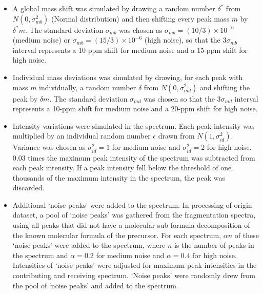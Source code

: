 \documentclass[
]{article}
\begin{document}
\begin{itemize}
\item
  A global mass shift was simulated by drawing a random number
  \(\delta^{*}\) from \(N\left( 0,\sigma_{mb}^{2} \right)\) (Normal
  distribution) and then shifting every peak mass \(m\) by
  \(\delta^{*}m\). The standard deviation \(\sigma_{mb}\) was chosen as
  \(\sigma_{mb} = (10/3) \times 10^{- 6}\) (medium noise) or
  \(\sigma_{mb} = (15/3) \times 10^{- 6}\) (high noise), so that the
  \(3\sigma_{mb}\) interval represents a 10-ppm shift for medium noise
  and a 15-ppm shift for high noise.
\item
  Individual mass deviations was simulated by drawing, for each peak
  with mass \(m\) individually, a random number \(\delta\) from
  \(N\left( 0,\sigma_{md}^{2} \right)\) and shifting the peak by
  \(\delta m\). The standard deviation \(\sigma_{md}\) was chosen so
  that the \(3\sigma_{md}\) interval represents a 10-ppm shift for
  medium noise and a 20-ppm shift for high noise.
\item
  Intensity variations were simulated in the spectrum. Each peak
  intensity was multiplied by an individual random number \(\epsilon\)
  drawn from \(N\left( 1,\sigma_{id}^{2} \right)\). Variance was chosen
  as \(\sigma_{id}^{2} = 1\) for medium noise and
  \(\sigma_{id}^{2} = 2\) for high noise. 0.03 times the maximum peak
  intensity of the spectrum was subtracted from each peak intensity. If
  a peak intensity fell below the threshold of one thousands of the
  maximum intensity in the spectrum, the peak was discarded.
\item
  Additional `noise peaks' were added to the spectrum. In processing of
  origin dataset, a pool of `noise peaks' was gathered from the
  fragmentation spectra, using all peaks that did not have a molecular
  sub-formula decomposition of the known molecular formula of the
  precursor. For each spectrum, \(\alpha n\) of these `noise peaks' were
  added to the spectrum, where \(n\) is the number of peaks in the
  spectrum and \(\alpha = 0.2\) for medium noise and \(\alpha = 0.4\)
  for high noise. Intensities of `noise peaks' were adjusted for maximum
  peak intensities in the contributing and receiving spectrum. `Noise
  peaks' were randomly drew from the pool of `noise peaks' and added to
  the spectrum.
\end{itemize}
\end{document}
